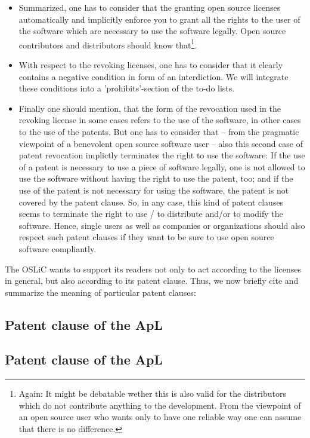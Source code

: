 \begin{itemize}
  \item Summarized, one has to consider that the granting open source licenses
  automatically and implicitly enforce you to grant all the rights to the user
  of the software which are necessary to use the software legally. Open source
  contributors and distributors should know that\footnote{Again: It might be
  debatable wether this is also valid for the distributors which do not
  contribute anything to the development. From the viewpoint of an open source
  user who wants only to have one reliable way one can assume that there is no
  difference.}.

  \item With respect to the revoking licenses, one has to consider that it
  clearly contains a negative condition in form of an interdiction. We will
  integrate these conditions into a 'prohibits'-section of the to-do lists.
  
  \item Finally one should mention, that the form of the revocation used in the
  revoking license in some cases refers to the use of the software, in other
  cases to the use of the patents. But one has to consider that -- from the
  pragmatic viewpoint of a benevolent open source software user -- also this
  second case of patent revocation implictly terminates the right to use the
  software: If the use of a patent is necessary to use a piece of software
  legally, one is not allowed to use the software without having the right to
  use the patent, too; and if the use of the patent is not necessary for using
  the software, the patent is not covered by the patent clause. So, in any case,
  this kind of patent clauses seems to terminate the right to use / to
  distribute and/or to modify the software. Hence, single users as well as
  companies or organizations should also respect such patent clauses if they
  want to be sure to use open source software compliantly.
\end{itemize}

The OSLiC wants to support its readers not only to act according to the licenses
in general, but also according to its patent clause. Thus, we now briefly cite
and summarize the meaning of particular patent clauses:

\subsection{Patent clause of the ApL}

\subsection{Patent clause of the ApL}

